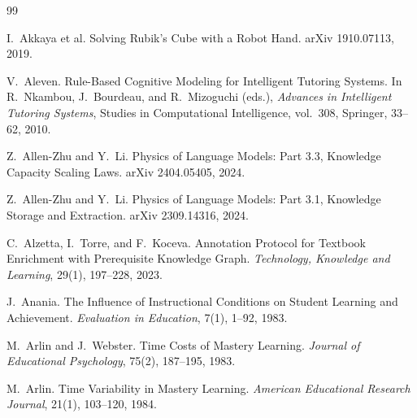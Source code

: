\documentclass[11pt]{article}
\theoremstyle{plain}
\theoremstyle{definition}
\theoremstyle{remark}
\begin{document}
%
\begin{thebibliography}{99}

 I.~Akkaya et al. Solving Rubik's Cube with a Robot Hand.
arXiv 1910.07113, 2019.

 V.~Aleven. Rule-Based Cognitive Modeling for Intelligent
Tutoring Systems. In R.~Nkambou, J.~Bourdeau, and R.~Mizoguchi (eds.), \emph{Advances in Intelligent
Tutoring Systems}, Studies in Computational Intelligence, vol.~308, Springer, 33--62, 2010.

 Z.~Allen-Zhu and Y.~Li. Physics of Language Models:
Part 3.3, Knowledge Capacity Scaling Laws. arXiv 2404.05405, 2024.

 Z.~Allen-Zhu and Y.~Li. Physics of Language
Models: Part 3.1, Knowledge Storage and Extraction. arXiv 2309.14316, 2024.

 C.~Alzetta, I.~Torre, and F.~Koceva.
Annotation Protocol for Textbook Enrichment with Prerequisite Knowledge Graph. \emph{Technology,
Knowledge and Learning}, 29(1), 197--228, 2023.

 J.~Anania. The Influence of Instructional Conditions on
Student Learning and Achievement. \emph{Evaluation in Education}, 7(1), 1--92, 1983.

 M.~Arlin and J.~Webster. Time Costs of Mastery
Learning. \emph{Journal of Educational Psychology}, 75(2), 187--195, 1983.

 M.~Arlin. Time Variability in Mastery Learning.
\emph{American Educational Research Journal}, 21(1), 103--120, 1984.


\end{thebibliography}
\end{document}
